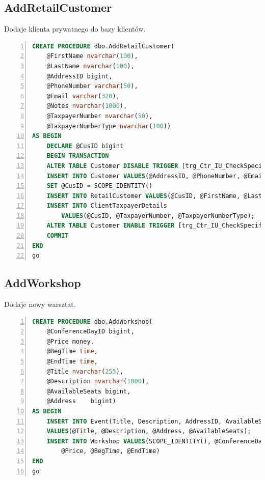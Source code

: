 \documentclass[]{article}
\begin{document}
	\subsection{AddRetailCustomer}
	Dodaje klienta prywatnego do bazy klientów.
	\begin{lstlisting}[language=SQL,
						showspaces=false,
						basicstyle=\ttfamily,
						numbers=left,
						numberstyle=\tiny,
						backgroundcolor=\color{lightg},
						keywordstyle=\color{lightblue},
						commentstyle=\color{gray}]
CREATE PROCEDURE dbo.AddRetailCustomer(
	@FirstName nvarchar(100),
	@LastName nvarchar(100),
	@AddressID bigint,
	@PhoneNumber varchar(50),
	@Email varchar(320),
	@Notes nvarchar(1000),
	@TaxpayerNumber nvarchar(50),
	@TaxpayerNumberType nvarchar(100))
AS BEGIN
	DECLARE @CusID bigint
	BEGIN TRANSACTION
	ALTER TABLE Customer DISABLE TRIGGER [trg_Ctr_IU_CheckSpecifiedType];
	INSERT INTO Customer VALUES(@AddressID, @PhoneNumber, @Email, @Notes);
	SET @CusID = SCOPE_IDENTITY()
	INSERT INTO RetailCustomer VALUES(@CusID, @FirstName, @LastName);
	INSERT INTO ClientTaxpayerDetails
		VALUES(@CusID, @TaxpayerNumber, @TaxpayerNumberType);
	ALTER TABLE Customer ENABLE TRIGGER [trg_Ctr_IU_CheckSpecifiedType];
	COMMIT
END
go
	\end{lstlisting}

	\subsection{AddWorkshop}
	Dodaje nowy warsztat.
	\begin{lstlisting}[language=SQL,
						showspaces=false,
						basicstyle=\ttfamily,
						numbers=left,
						numberstyle=\tiny,
						backgroundcolor=\color{lightg},
						keywordstyle=\color{lightblue},
						commentstyle=\color{gray}]
CREATE PROCEDURE dbo.AddWorkshop(
	@ConferenceDayID bigint,
	@Price money,
	@BegTime time,
	@EndTime time,
	@Title nvarchar(255),
	@Description nvarchar(1000),
	@AvailableSeats bigint,
	@Address	bigint)
AS BEGIN
	INSERT INTO Event(Title, Description, AddressID, AvailableSeats)
	VALUES(@Title, @Description, @Address, @AvailableSeats);
	INSERT INTO Workshop VALUES(SCOPE_IDENTITY(), @ConferenceDayID,
		@Price, @BegTime, @EndTime)
END
go
	\end{lstlisting}
\end{document}

